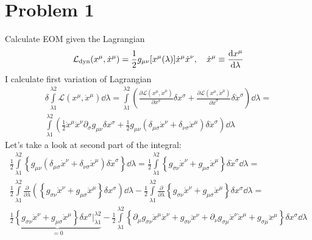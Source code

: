 
\section*{Problem 1}
Calculate EOM given the Lagrangian
%
\begin{equation}
    \mathcal{L}_{\text{dyn}}(x^\mu,\dot{x}^\mu) =
    \frac{1}{2}g_{\mu\nu}[x^\mu(\lambda)]\dot{x}^\mu\dot{x}^\nu, \quad
    \dot{x}^{\mu} \equiv \frac{\operatorname{d\!} x^\mu}{\dd\lambda}
\end{equation}
%
I calculate first variation of Lagrangian
%
\begin{multline}
    \delta\int\limits_{\lambda1}^{\lambda2}\mathcal{L}(x^\mu,\dot{x}^\mu)\dd\lambda =
    \int\limits_{\lambda1}^{\lambda2}
    \left(\frac{\partial\mathcal{L}(x^\mu,\dot{x}^\mu)}{\partial x^\sigma}\delta x^\sigma +
    \frac{\partial\mathcal{L}(x^\mu,\dot{x}^\mu)}{\partial \dot{x}^\sigma}\delta \dot{x}^\sigma\right)\dd\lambda = \\
    \int\limits_{\lambda1}^{\lambda2}
    \left(\frac{1}{2}\dot{x}^\mu\dot{x}^\nu \partial_\sigma g_{\mu\nu} \delta x^\sigma +
    \frac{1}{2}g_{\mu\nu}(\delta_{\mu\sigma} \dot{x}^\nu + \delta_{\nu\sigma} \dot{x}^\mu)\delta \dot{x}^\sigma\right)\dd\lambda
    \label{eq:ass3_prob1}
\end{multline}
%
Let's take a look at second part of the integral:
%
\begin{multline}
    \frac{1}{2}\int\limits_{\lambda1}^{\lambda2}
    \left\{g_{\mu\nu}(\delta_{\mu\sigma}
    \dot{x}^\nu + \delta_{\nu\sigma} \dot{x}^\mu)\delta \dot{x}^\sigma\right\}\dd\lambda =
    \frac{1}{2}\int\limits_{\lambda1}^{\lambda2}
    \left\{g_{\sigma\nu}\dot{x}^\nu + g_{\mu\sigma}\dot{x}^\mu \right\}
    \delta\dot{x}^\sigma\dd\lambda = \\
    \frac{1}{2}\int\limits_{\lambda1}^{\lambda2}
    \frac{\partial}{\partial\lambda}\left(\left\{
    g_{\sigma\nu}\dot{x}^\nu + g_{\mu\sigma}\dot{x}^\mu
    \right\}\delta x^\sigma\right)\dd\lambda -
    \frac{1}{2}\int\limits_{\lambda1}^{\lambda2}
    \frac{\partial}{\partial\lambda}\left\{
    g_{\sigma\nu}\dot{x}^\nu + g_{\mu\sigma}\dot{x}^\mu
    \right\}\delta x^\sigma\dd\lambda= \\
    \frac{1}{2}\underbrace{\left\{g_{\sigma\nu}\dot{x}^\nu + g_{\mu\sigma}\dot{x}^\mu\right\} \delta x^\sigma \Bigg|_{\lambda1}^{\lambda2}}_{=0} -
    \frac{1}{2}\int\limits_{\lambda1}^{\lambda2}
    \left\{
    \partial_{\mu}g_{\sigma\nu}\dot{x}^\mu\dot{x}^\nu + g_{\sigma\nu}\ddot{x}^\nu +
    \partial_{\nu}g_{\sigma\mu}\dot{x}^\nu\dot{x}^\mu + g_{\sigma\mu}\ddot{x}^\mu
    \right\}\delta x^\sigma\dd\lambda \\
\end{multline}
